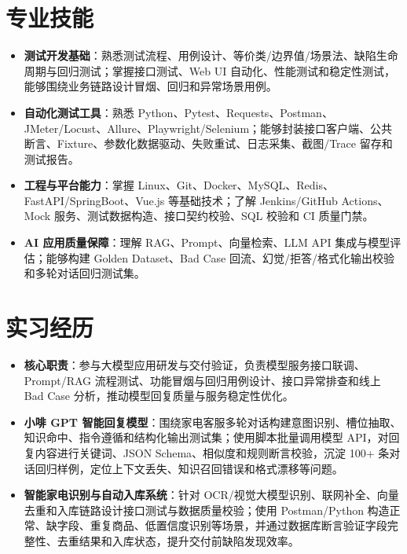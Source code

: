 \documentclass[10pt]{article}
\begin{document}
    \ResumeContactBar
    \ResumeProfileAndEducation


    \section[专业技能]{\makebox[\iconwidth][c]{\color{primarycolor}{\faWrench}}\quad 专业技能}
    \begin{itemize}
        \item \textbf{测试开发基础}：熟悉测试流程、用例设计、等价类/边界值/场景法、缺陷生命周期与回归测试；掌握接口测试、Web UI 自动化、性能测试和稳定性测试，能够围绕业务链路设计冒烟、回归和异常场景用例。
        \item \textbf{自动化测试工具}：熟悉 Python、Pytest、Requests、Postman、JMeter/Locust、Allure、Playwright/Selenium；能够封装接口客户端、公共断言、Fixture、参数化数据驱动、失败重试、日志采集、截图/Trace 留存和测试报告。
        \item \textbf{工程与平台能力}：掌握 Linux、Git、Docker、MySQL、Redis、FastAPI/SpringBoot、Vue.js 等基础技术；了解 Jenkins/GitHub Actions、Mock 服务、测试数据构造、接口契约校验、SQL 校验和 CI 质量门禁。
        \item \textbf{AI 应用质量保障}：理解 RAG、Prompt、向量检索、LLM API 集成与模型评估；能够构建 Golden Dataset、Bad Case 回流、幻觉/拒答/格式化输出校验和多轮对话回归测试集。
    \end{itemize}



    \section[实习经历]{\makebox[\iconwidth][c]{\color{primarycolor}{\faBriefcase}}\quad 实习经历}

    \begin{itemize}
        \item \textbf{核心职责}：参与大模型应用研发与交付验证，负责模型服务接口联调、Prompt/RAG 流程测试、功能冒烟与回归用例设计、接口异常排查和线上 Bad Case 分析，推动模型回复质量与服务稳定性优化。
        \item \textbf{小啡 GPT 智能回复模型}：围绕家电客服多轮对话构建意图识别、槽位抽取、知识命中、指令遵循和结构化输出测试集；使用脚本批量调用模型 API，对回复内容进行关键词、JSON Schema、相似度和规则断言校验，沉淀 100+ 条对话回归样例，定位上下文丢失、知识召回错误和格式漂移等问题。
        \item \textbf{智能家电识别与自动入库系统}：针对 OCR/视觉大模型识别、联网补全、向量去重和入库链路设计接口测试与数据质量校验；使用 Postman/Python 构造正常、缺字段、重复商品、低置信度识别等场景，并通过数据库断言验证字段完整性、去重结果和入库状态，提升交付前缺陷发现效率。
    \end{itemize}
\end{document}
